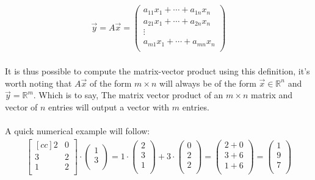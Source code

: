 \documentclass[11pt, a4paper]{article}
\begin{document}
\begin{align*}
  \vec{y} = A\vec{x} =
  \begin{pmatrix}
    a_{11}x_1 + \cdots + a_{1n}x_n\\
    a_{21}x_1 + \cdots + a_{2n}x_n\\
    \vdots\\
    a_{m1}x_1 + \cdots + a_{mn}x_n\\
  \end{pmatrix}
\end{align*}
\\
It is thus possible to compute the matrix-vector product using this definition, it's worth noting that
$A\vec{x}$ of the form $m \times n$ will always be of the form $\vec{x} \in \mathbb{R}^n$ and 
$\vec{y} = \mathbb{R}^m$. Which is to say, The matrix vector product of an $m \times n$ 
matrix and vector of $n$ entries will output
a vector with $m$ entries.\\
\\
A quick numerical example will follow:
\begin{align*}
  \begin{bmatrix}[cc]
    2 & 0\\
    3 & 2\\
    1 & 2\\
  \end{bmatrix}
  \cdot
  \begin{pmatrix}
    1\\
    3\\
  \end{pmatrix}
  =
  1 \cdot \begin{pmatrix} 2\\ 3\\ 1\\ \end{pmatrix} +
  3 \cdot \begin{pmatrix} 0\\ 2 \\ 2\\ \end{pmatrix} =
    \begin{pmatrix} 2+0\\ 3+6\\ 1+6\\ \end{pmatrix}
  =
  \begin{pmatrix} 1\\ 9\\ 7\\ \end{pmatrix}
\end{align*}
\end{document}
